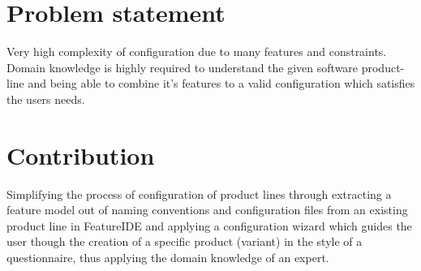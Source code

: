 \section*{Problem statement}
Very high complexity of configuration due to many features and constraints. Domain knowledge is highly required to understand the given software product-line and being able to combine it's features to a valid configuration which satisfies the users needs.

\section*{Contribution}

Simplifying the process of configuration of product lines through extracting a feature model out of naming conventions and configuration files from an existing product line in FeatureIDE and applying a configuration wizard which guides the user though the creation of a specific product (variant) in the style of a questionnaire, thus applying the domain knowledge of an expert.


